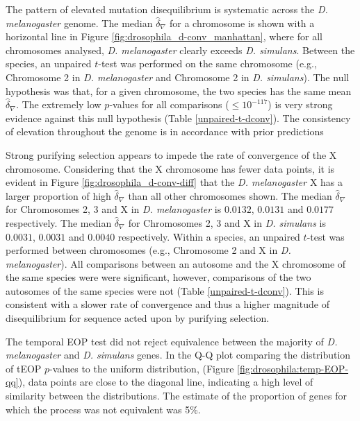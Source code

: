 

The pattern of elevated mutation disequilibrium is systematic across the \textit{D. melanogaster} genome. The median $\hat \delta_\nabla$ for a chromosome is shown with a horizontal line in Figure \ref{fig:drosophila_d-conv_manhattan}, where for all chromosomes analysed, \textit{D. melanogaster} clearly exceeds \textit{D. simulans}. Between the species, an unpaired $t$-test was performed on the same chromosome (e.g., Chromosome 2 in \textit{D. melanogaster} and Chromosome 2 in \textit{D. simulans}). The null hypothesis was that, for a given chromosome, the two species has the same mean $\hat\delta_\nabla$. The extremely low $p$-values for all comparisons ($\leq10^{-117}$) is very strong evidence against this null hypothesis (Table \ref{unpaired-t-dconv}). The consistency of elevation throughout the genome is in accordance with prior predictions

Strong purifying selection appears to impede the rate of convergence of the X chromosome. Considering that the X chromosome has fewer data points, it is evident in Figure \ref{fig:drosophila_d-conv-diff} that the \textit{D. melanogaster} X has a larger proportion of high $\hat \delta_\nabla$ than all other chromosomes shown. The median $\hat \delta_\nabla$ for Chromosomes 2, 3 and X in \textit{D. melanogaster} is $0.0132$, $0.0131$ and $0.0177$ respectively. The median $\hat \delta_\nabla$ for Chromosomes 2, 3 and X in \textit{D. simulans} is $0.0031$, $0.0031$ and $0.0040$ respectively. Within a species, an unpaired $t$-test was performed between chromosomes (e.g., Chromosome 2 and X in \textit{D. melanogaster}). All comparisons between an autosome and the X chromosome of the same species were were significant, however, comparisons of the two autosomes of the same species were not (Table \ref{unpaired-t-dconv}). This is consistent with a slower rate of convergence and thus a higher magnitude of disequilibrium for sequence acted upon by purifying selection. 





The temporal EOP test did not reject equivalence between the majority of \textit{D. melanogaster} and \textit{D. simulans} genes. In the Q-Q plot comparing the distribution of tEOP $p$-values to the uniform distribution, (Figure \ref{fig:drosophila:temp-EOP-qq}), data points are close to the diagonal line, indicating a high level of similarity between the distributions. The estimate of the proportion of genes for which the process was not equivalent was 5\%.

